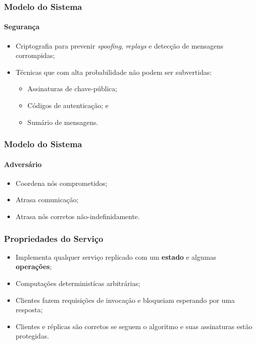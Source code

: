 \documentclass{beamer}
\begin{document}
\begin{frame}
  \frametitle{Modelo do Sistema}
  \framesubtitle{Segurança}

  \begin{itemize}
    \item
      Criptografia para prevenir \textit{spoofing}, \textit{replays} e detecção de mensagens corrompidas;

    \item
      Técnicas que com alta probabilidade não podem ser subvertidas:
      \begin{itemize}
        \item
          Assinaturas de chave-pública;
          
        \item
          Códigos de autenticação; e
          
        \item
          Sumário de mensagens.
      \end{itemize}
  \end{itemize}
\end{frame}

\begin{frame}
  \frametitle{Modelo do Sistema}
  \framesubtitle{Adversário}

  \begin{itemize}
      \item
        Coordena nós comprometidos;

      \pause
      \item
        Atrasa comunicação;

      \pause
      \item
        Atrasa nós corretos não-indefinidamente.
  \end{itemize}
\end{frame}

\begin{frame}
  \frametitle{Propriedades do Serviço}

  \begin{itemize}
    \item
      Implementa qualquer serviço replicado com um \textbf{estado} e algumas \textbf{operações};

      \pause
    \item
      Computações deterministícas arbitrárias;

      \pause
    \item
      Clientes fazem requisições de invocação e bloqueiam esperando por uma resposta;

      \pause
    \item
      Clientes e réplicas são corretos se seguem o algoritmo e suas assinaturas estão protegidas.
  \end{itemize}
\end{frame}
\end{document}
